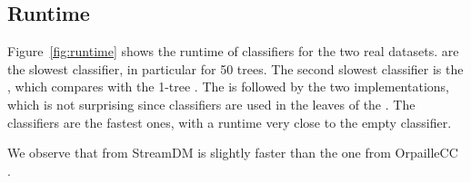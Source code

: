 \subsection{Runtime}
Figure~\ref{fig:runtime} shows the runtime of classifiers for the two real
datasets.
\mondrianforest are the slowest classifier, in particular for 50 trees. The
second slowest classifier is the \hoeffdingtree, which compares with the 1-tree
\mondrianforest. The \hoeffdingtree is followed by the two \naivebayes
implementations, which is not surprising since \naivebayes classifiers are used
in the leaves of the \hoeffdingtree. The \mcnn classifiers are the fastest
ones, with a runtime very close to the empty classifier.

We observe that \naivebayes from StreamDM is slightly faster than the one
from OrpailleCC .

